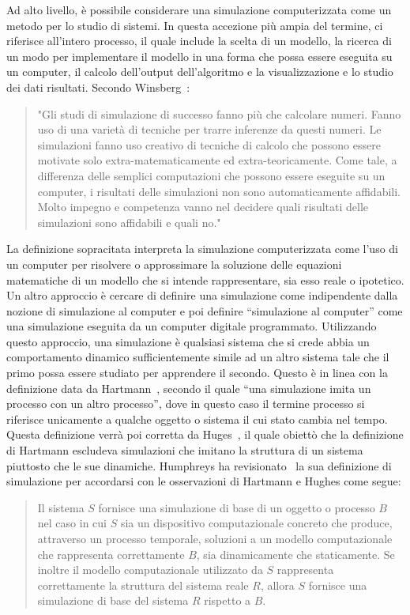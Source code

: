 \documentclass[12pt,a4paper,openright,twoside]{book}
\begin{document}
Ad alto livello, è possibile considerare una simulazione computerizzata come un metodo per lo studio di sistemi. In questa accezione più ampia del termine, ci riferisce all'intero processo, il quale include la scelta di un modello, la ricerca di un modo per implementare il modello in una forma che possa essere eseguita su un computer, il calcolo dell'output dell'algoritmo e la visualizzazione e lo studio dei dati risultati. Secondo Winsberg~\cite{Winsberg_2003}: 
\begin{quotation}
    "Gli studi di simulazione di successo fanno più che calcolare numeri. Fanno uso di una varietà di tecniche per trarre inferenze da questi numeri. Le simulazioni fanno uso creativo di tecniche di calcolo che possono essere motivate solo extra-matematicamente ed extra-teoricamente. Come tale, a differenza delle semplici computazioni che possono essere eseguite su un computer, i risultati delle simulazioni non sono automaticamente affidabili. Molto impegno e competenza vanno nel decidere quali risultati delle simulazioni sono affidabili e quali no." 
\end{quotation}
La definizione sopracitata interpreta la simulazione computerizzata come l'uso di un computer per risolvere o approssimare la soluzione delle equazioni matematiche di un modello che si intende rappresentare, sia esso reale o ipotetico. Un altro approccio è cercare di definire una simulazione come indipendente dalla nozione di simulazione al computer e poi definire ``simulazione al computer'' come una simulazione eseguita da un computer digitale programmato. Utilizzando questo approccio, una simulazione è qualsiasi sistema che si crede abbia un comportamento dinamico sufficientemente simile ad un altro sistema tale che il primo possa essere studiato per apprendere il secondo. Questo è in linea con la definizione data da Hartmann~\cite{Hartmann1996-HARTWA-2}, secondo il quale ``una simulazione imita un processo con un altro processo'', dove in questo caso il termine processo si riferisce unicamente a qualche oggetto o sistema il cui stato cambia nel tempo. Questa definizione verrà poi corretta da Huges~\cite{Hughes_1999}, il quale obiettò che la definizione di Hartmann escludeva simulazioni che imitano la struttura di un sistema piuttosto che le sue dinamiche. 
Humphreys ha revisionato~\cite{Humphreys2004-HUMEOC-2} la sua definizione di simulazione per accordarsi con le osservazioni di Hartmann e Hughes come segue: 
\begin{quotation}
    Il sistema $S$ fornisce una simulazione di base di un oggetto o processo $B$ nel caso in cui $S$ sia un dispositivo computazionale concreto che produce, attraverso un processo temporale, soluzioni a un modello computazionale che rappresenta correttamente $B$, sia dinamicamente che staticamente. Se inoltre il modello computazionale utilizzato da $S$ rappresenta correttamente la struttura del sistema reale $R$, allora $S$ fornisce una simulazione di base del sistema $R$ rispetto a $B$. 
\end{quotation}
\end{document}

